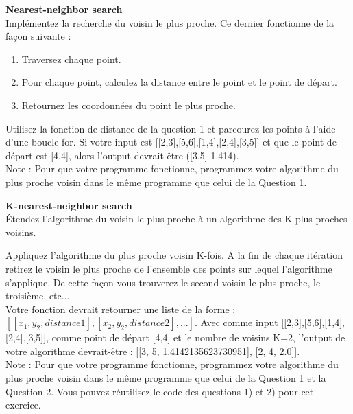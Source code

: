 \begin{Exercice}[10 minutes]\textbf{Nearest-neighbor search}\\

Implémentez la recherche du voisin le plus proche. Ce dernier fonctionne de la façon suivante :
\begin{enumerate}
    \item Traversez chaque point.
    \item Pour chaque point, calculez la distance entre le point et le point de départ.
    \item Retournez les coordonnées du point le plus proche.
\end{enumerate}
    
\begin{conseil}
    Utilisez la fonction de distance de la question 1 et parcourez les points à l'aide d'une boucle for. Si votre input est [[2,3],[5,6],[1,4],[2,4],[3,5]] et que le point de départ est [4,4], alors l'output devrait-être ([3,5] 1.414).\\
    
    Note : Pour que votre programme fonctionne, programmez votre algorithme du plus proche voisin dans le même programme que celui de la Question 1.
\end{conseil}
\begin{solution}
    
\end{solution}
\end{Exercice}


\begin{Exercice}[15 minutes]\textbf{K-nearest-neighbor search}\\


Étendez l'algorithme du voisin le plus proche à un algorithme des K plus proches voisins.\\

\begin{conseil}
Appliquez l'algorithme du plus proche voisin K-fois. A la fin de chaque itération retirez le voisin le plus proche de l'ensemble des points sur lequel l'algorithme s'applique. De cette façon vous trouverez le second voisin le plus proche, le troisième, etc...\\

Votre fonction devrait retourner une liste de la forme : $[[x_1,y_2, distance1],[x_2,y_2,distance2],...]$. Avec comme input [[2,3],[5,6],[1,4],[2,4],[3,5]], comme point de départ [4,4] et le nombre de voisins K=2, l'output de votre algorithme devrait-être : [[3, 5, 1.4142135623730951], [2, 4, 2.0]].\\

Note : Pour que votre programme fonctionne, programmez votre algorithme du plus proche voisin dans le même programme que celui de la Question 1 et la Question 2. Vous pouvez réutilisez le code des questions 1) et 2) pour cet exercice.
\end{conseil}

\begin{solution}
    
\end{solution}
\end{Exercice}
\newpage
